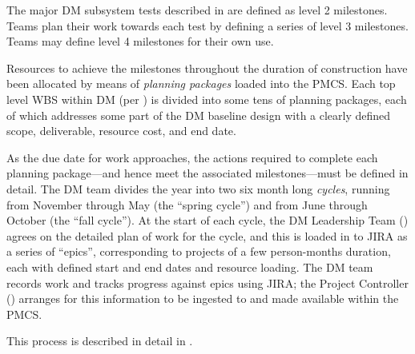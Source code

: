 The major DM subsystem tests described in  are defined as level 2 milestones.
Teams plan their work towards each test by defining a series of level 3 milestones.
Teams may define level 4 milestones for their own use.

Resources to achieve the milestones throughout the duration of construction have been allocated by means of \textit{planning packages} loaded into the PMCS.
Each top level WBS within DM (per ) is divided into some tens of planning packages, each of which addresses some part of the DM baseline design with a clearly defined scope, deliverable, resource cost, and end date.

As the due date for work approaches, the actions required to complete each planning package---and hence meet the associated milestones---must be defined in detail.
The DM team divides the year into two six month long \textit{cycles}, running from November through May (the ``spring cycle'') and from June through October (the ``fall cycle'').
At the start of each cycle, the DM Leadership Team () agrees on the detailed plan of work for the cycle, and this is loaded in to JIRA as a series of ``epics'', corresponding to projects of a few person-months duration, each with defined start and end dates and resource loading.
The DM team records work and tracks progress against epics using JIRA; the Project Controller () arranges for this information to be ingested to and made available within the PMCS.

This process is described in detail in .
